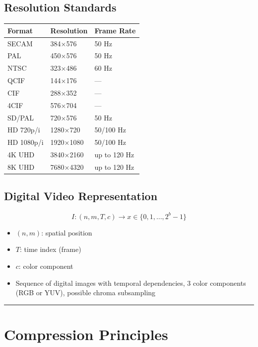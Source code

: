 \subsection{Resolution Standards}

\begin{center}
\begin{tabular}{|l|l|l|}
\hline
\textbf{Format} & \textbf{Resolution} & \textbf{Frame Rate} \\ \hline
SECAM & 384×576 & 50 Hz \\ \hline
PAL & 450×576 & 50 Hz \\ \hline
NTSC & 323×486 & 60 Hz \\ \hline
QCIF & 144×176 & — \\ \hline
CIF & 288×352 & — \\ \hline
4CIF & 576×704 & — \\ \hline
SD/PAL & 720×576 & 50 Hz \\ \hline
HD 720p/i & 1280×720 & 50/100 Hz \\ \hline
HD 1080p/i & 1920×1080 & 50/100 Hz \\ \hline
4K UHD & 3840×2160 & up to 120 Hz \\ \hline
8K UHD & 7680×4320 & up to 120 Hz \\ \hline
\end{tabular}
\end{center}

\subsection{Digital Video Representation}

\[
I : (n, m, T, c) \rightarrow x \in \{0, 1, \ldots, 2^b - 1\}
\]

\begin{itemize}
\item $(n,m)$: spatial position
\item $T$: time index (frame)
\item $c$: color component
\item Sequence of digital images with temporal dependencies, 3 color components (RGB or YUV), possible chroma subsampling
\end{itemize}

\bigskip\hrule\bigskip

\section{Compression Principles}

